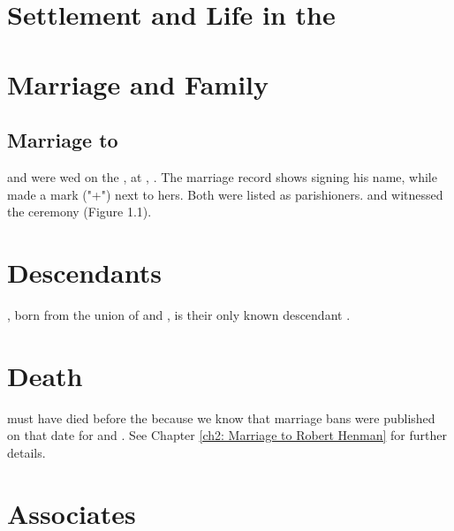 \section[{Settlement and Life in the Cape Colony}]{Settlement and Life in the \capeColony}

\section{Marriage and Family}

\subsection[Marriage to Mary Welch]{Marriage to \welchMName}
\label{ch1: Marriage to Mary Welch}

\mcdonaldJName{} and \welchMName{} were wed on the , at \stBotolphWithoutBishopsgate{}, \bishopsgateFull{} \autocite{FS:JamesMcDonaldMarriage} \autocite{settlers:JamesMcDonald}. The marriage record shows \mcdonaldJNameOnly{} signing his name, while \welchMNameOnly{} made a mark ("+") next to hers. Both were listed as parishioners. \nettoIName{} and \nettoCNameNee{} witnessed the ceremony (Figure 1.1).

\section{Descendants}

\mcdonaldAName{}, born from the union of \mcdonaldJName{} and \welchMName{}, is their only known descendant \autocite[46]{nash:1820}.

\section{Death}

\mcdonaldJNameOnly{} must have died before the  because we know that marriage bans were published on that date for \welchMName{} and \henmanRName{}. See Chapter \ref{ch2: Marriage to Robert Henman} for further details.

\section{Associates}